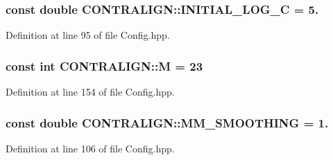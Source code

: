 \hypertarget{namespace_c_o_n_t_r_a_l_i_g_n_aeee5c8bdae11d43911362af4a21348a8}{
\subsubsection[{I\+N\+I\+T\+I\+A\+L\+\_\+\+L\+O\+G\+\_\+\+C}]{\setlength{\rightskip}{0pt plus 5cm}const double C\+O\+N\+T\+R\+A\+L\+I\+G\+N\+::\+I\+N\+I\+T\+I\+A\+L\+\_\+\+L\+O\+G\+\_\+\+C = 5.}}\label{namespace_c_o_n_t_r_a_l_i_g_n_aeee5c8bdae11d43911362af4a21348a8}


Definition at line 95 of file Config.\+hpp.

\hypertarget{namespace_c_o_n_t_r_a_l_i_g_n_a7ce1fa1c6c36bd3bda0f8b508e6d8905}{
\subsubsection[{M}]{\setlength{\rightskip}{0pt plus 5cm}const int C\+O\+N\+T\+R\+A\+L\+I\+G\+N\+::\+M = 23}}\label{namespace_c_o_n_t_r_a_l_i_g_n_a7ce1fa1c6c36bd3bda0f8b508e6d8905}


Definition at line 154 of file Config.\+hpp.

\hypertarget{namespace_c_o_n_t_r_a_l_i_g_n_a5526bbb095dad1642772b911061636e9}{
\subsubsection[{M\+M\+\_\+\+S\+M\+O\+O\+T\+H\+I\+N\+G}]{\setlength{\rightskip}{0pt plus 5cm}const double C\+O\+N\+T\+R\+A\+L\+I\+G\+N\+::\+M\+M\+\_\+\+S\+M\+O\+O\+T\+H\+I\+N\+G = 1.}}\label{namespace_c_o_n_t_r_a_l_i_g_n_a5526bbb095dad1642772b911061636e9}


Definition at line 106 of file Config.\+hpp.

